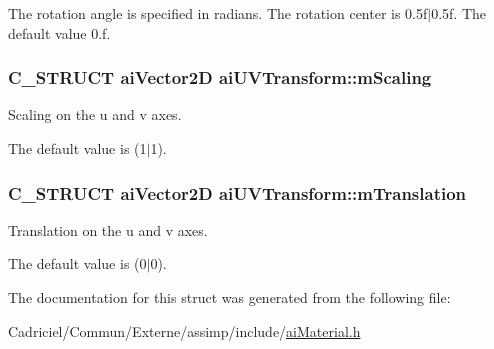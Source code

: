 The rotation angle is specified in radians. The rotation center is 0.\-5f$\vert$0.5f. The default value 0.\-f. \hypertarget{structai_u_v_transform_a89429a027cbf914e7212e48149a957c8}{
\subsubsection[{m\-Scaling}]{\setlength{\rightskip}{0pt plus 5cm}C\-\_\-\-S\-T\-R\-U\-C\-T {\bf ai\-Vector2\-D} ai\-U\-V\-Transform\-::m\-Scaling}}\label{structai_u_v_transform_a89429a027cbf914e7212e48149a957c8}
Scaling on the u and v axes.

The default value is (1$\vert$1). \hypertarget{structai_u_v_transform_a8c7f35959aa342bf0cef670246fbb813}{
\subsubsection[{m\-Translation}]{\setlength{\rightskip}{0pt plus 5cm}C\-\_\-\-S\-T\-R\-U\-C\-T {\bf ai\-Vector2\-D} ai\-U\-V\-Transform\-::m\-Translation}}\label{structai_u_v_transform_a8c7f35959aa342bf0cef670246fbb813}
Translation on the u and v axes.

The default value is (0$\vert$0). 

The documentation for this struct was generated from the following file\-:\begin{DoxyCompactItemize}
\item 
Cadriciel/\-Commun/\-Externe/assimp/include/\hyperlink{ai_material_8h}{ai\-Material.\-h}\end{DoxyCompactItemize}
